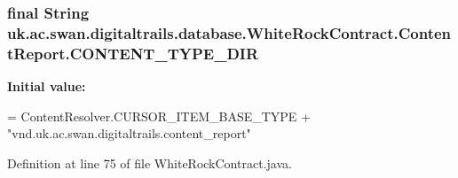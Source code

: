\hypertarget{classuk_1_1ac_1_1swan_1_1digitaltrails_1_1database_1_1_white_rock_contract_1_1_content_report_a766b9c019f286d4c9c8fc4b9a4114e31}{
\subsubsection[{C\+O\+N\+T\+E\+N\+T\+\_\+\+T\+Y\+P\+E\+\_\+\+D\+I\+R}]{\setlength{\rightskip}{0pt plus 5cm}final String uk.\+ac.\+swan.\+digitaltrails.\+database.\+White\+Rock\+Contract.\+Content\+Report.\+C\+O\+N\+T\+E\+N\+T\+\_\+\+T\+Y\+P\+E\+\_\+\+D\+I\+R\hspace{0.3cm}{\ttfamily [static]}}}\label{classuk_1_1ac_1_1swan_1_1digitaltrails_1_1database_1_1_white_rock_contract_1_1_content_report_a766b9c019f286d4c9c8fc4b9a4114e31}
{\bfseries Initial value\+:}
\begin{DoxyCode}
= ContentResolver.CURSOR\_ITEM\_BASE\_TYPE +
                \textcolor{stringliteral}{"vnd.uk.ac.swan.digitaltrails.content\_report"}
\end{DoxyCode}


Definition at line 75 of file White\+Rock\+Contract.\+java.

